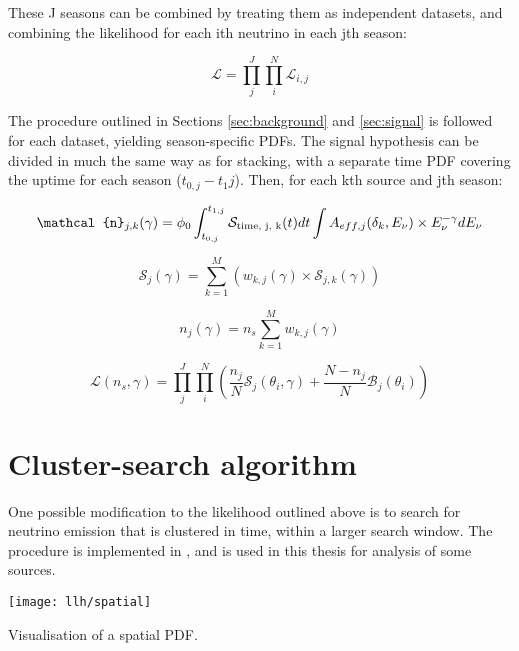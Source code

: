 These J seasons can be combined by treating them as independent datasets, and combining the likelihood for each ith neutrino in each jth season:

\begin{equation}
\mathcal{L} = \prod_{j}^{J}\prod_{i}^{N} \mathcal{L}_{i, j}
\end{equation}

The procedure outlined in Sections \ref{sec:background} and \ref{sec:signal} is followed for each dataset, yielding season-specific PDFs. The signal hypothesis can be divided in much the same way as for stacking, with a separate time PDF covering the uptime for each season ($t_{0, j} - t_1{j}$). Then, for each kth source and jth season:

\begin{equation}
\mathcal{n}_{j, k} (\gamma) = \phi_{0} \int_{t_{0, j}}^{t_{1,j}} \mathcal{S}_{\textup{time, j, k}}(t) dt \int A_{eff, j}(\delta_{k}, E_{\nu}) \times E_{\nu}^{-\gamma} dE_{\nu}
\label{eq:n_k_full}
\end{equation}

\begin{equation}
\mathcal{S}_{j}(\gamma) = \sum^{M}_{k=1} \left( w_{k, j}(\gamma)  \times \mathcal{S}_{j, k}(\gamma)  \right)
\label{eq:S_stacked_season}
\end{equation}

\begin{equation}
n_{j}(\gamma) = n_{s} \sum^{M}_{k=1} w_{k, j}(\gamma)
\label{eq:n_j}
\end{equation}

\begin{equation}
\mathcal{L}(n_{s}, \gamma) = \prod_{j}^{J} \prod_{i}^{N} \left(\frac{n_{j}}{N} \mathcal{S}_{j}(\theta_{i}, \gamma) + \frac{N - n_{j}}{N} \mathcal{B}_{j}(\theta_{i})  \right)
\label{eq:ps_llh_seasons}
\end{equation}

\section{Cluster-search algorithm}
\label{sec:cluster_algorithm}

One possible modification to the likelihood outlined above is to search for neutrino emission that is clustered in time, within a larger search window. The procedure is implemented in  \flarestack{}, and is used in this thesis for analysis of some sources. 

\begin{marginfigure}
	\centering \texttt{[image: llh/spatial]}
	\caption{Visualisation of a spatial PDF.}
	\label{fig:spatial}
\end{marginfigure}

